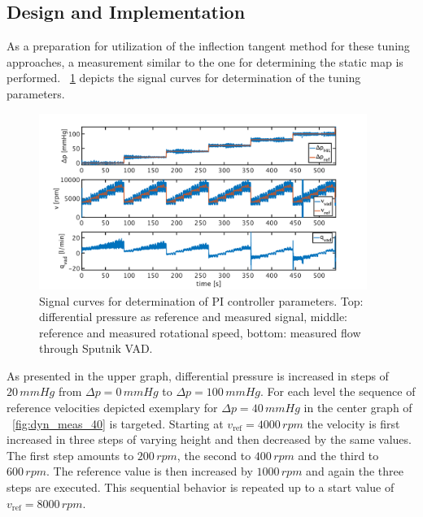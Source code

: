 \subsection{Design and Implementation}
As a preparation for utilization of the inflection tangent method for these tuning approaches, a measurement similar to the one for determining the static map is performed. \figurename~\ref{fig:dyn_meas} depicts the signal curves for determination of the tuning parameters.
\begin{figure}[ht]
  \centering
  \includegraphics[width=0.95\textwidth]{images/chapt_5/dyn_measure.pdf}
  \caption[Signal curves for determination of PI controller parameters]{Signal curves for determination of PI controller parameters. Top: differential pressure as reference and measured signal, middle: reference and measured rotational speed, bottom: measured flow through Sputnik VAD.}
  \label{fig:dyn_meas}
\end{figure}
As presented in the upper graph, differential pressure is increased in steps of $20\,mmHg$ from $\Delta{p}=0\,mmHg$ to $\Delta{p}=100\,mmHg$. For each level the sequence of reference velocities depicted exemplary for $\Delta{p}=40\,mmHg$ in the center graph of \figurename~\ref{fig:dyn_meas_40} is targeted. Starting at $v_{\mathrm{ref}}=4000 \, rpm $ the velocity is first increased in three steps of varying height and then decreased by the same values. The first step amounts to $200 \, rpm$, the second to $400 \, rpm$ and the third to $600 \, rpm$. The reference value is then increased by $1000\,rpm$ and again the three steps are executed.
This sequential behavior is repeated up to a start value of $v_{\mathrm{ref}}=8000\,rpm$.

